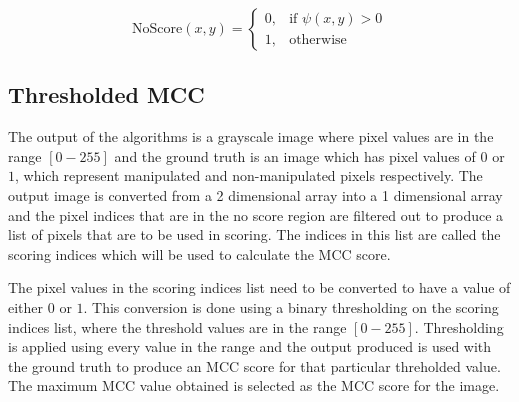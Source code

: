 \begin{equation} \label{eq:bin_inv}
    \text{NoScore}(x,y)=\begin{cases}
        0, & \text{if } \psi(x,y) > 0  \\
        1, & \text{otherwise}
     \end{cases}
\end{equation}

\subsection{Thresholded MCC}

The output of the algorithms is a grayscale image where pixel values are in the range $[0-255]$ and the ground truth is an image which has pixel values of $0$ or $1$, which 
represent manipulated and non-manipulated pixels respectively. The output image is converted from a 2 dimensional array into a 1 dimensional array and the pixel indices that
are in the no score region are filtered out to produce a list of pixels that are to be used in scoring. The indices in this list are called the scoring indices which will 
be used to calculate the MCC score.

The pixel values in the scoring indices list need to be converted to have a value of either $0$ or $1$. This conversion is done using a binary thresholding on the scoring 
indices list, where the threshold values are in the range $[0-255]$. Thresholding is applied using every value in the range and the output produced is used with the ground truth
to produce an MCC score for that particular threholded value. The maximum MCC value obtained is selected as the MCC score for the image.